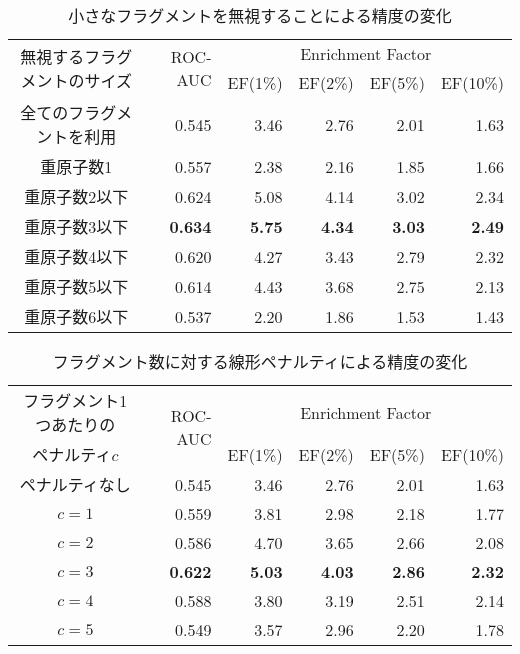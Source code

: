 \begin{table}[t] \centering
	\caption{小さなフラグメントを無視することによる精度の変化}
	\label{table:omit}
	\begin{tabular}{c|rrrrr}
	\hline
	\multirow{2}{*}{無視するフラグメントのサイズ}	&\multirow{2}{*}{ROC-AUC}	&\multicolumn{4}{c}{Enrichment Factor}				\\
										&						&EF(1\%)		&EF(2\%)		&EF(5\%)		&EF(10\%)	\\ \hline
	全てのフラグメントを利用					&0.545					&3.46		&2.76		&2.01		&1.63		\\
	重原子数1							&0.557					&2.38		&2.16		&1.85		&1.66		\\
	重原子数2以下						&0.624					&5.08		&4.14		&3.02		&2.34		\\
	重原子数3以下						&{\bf 0.634}				&{\bf 5.75}	&{\bf 4.34}	&{\bf 3.03}	&{\bf 2.49}	\\
	重原子数4以下						&0.620					&4.27		&3.43		&2.79		&2.32		\\
	重原子数5以下						&0.614					&4.43		&3.68		&2.75		&2.13		\\
	重原子数6以下						&0.537					&2.20		&1.86		&1.53		&1.43		\\ \hline
	\end{tabular}
\end{table}

\begin{table}[hp] \centering
	\caption{フラグメント数に対する線形ペナルティによる精度の変化}
	\label{table:penalty}
	\begin{tabular}{c|rrrrr}
	\hline
	フラグメント1つあたりの	&\multirow{2}{*}{ROC-AUC}	&\multicolumn{4}{c}{Enrichment Factor}				\\
	ペナルティ$c$			&						&EF(1\%)		&EF(2\%)		&EF(5\%)		&EF(10\%)	\\ \hline
	ペナルティなし			&0.545					&3.46		&2.76		&2.01		&1.63		\\
	$c=1$				&0.559					&3.81		&2.98		&2.18		&1.77		\\
	$c=2$				&0.586					&4.70		&3.65		&2.66		&2.08		\\
	$c=3$				&{\bf 0.622}				&{\bf 5.03}	&{\bf 4.03}	&{\bf 2.86}	&{\bf 2.32}	\\
	$c=4$				&0.588					&3.80		&3.19		&2.51		&2.14		\\
	$c=5$				&0.549					&3.57		&2.96		&2.20		&1.78		\\ \hline
	\end{tabular}
\end{table}


